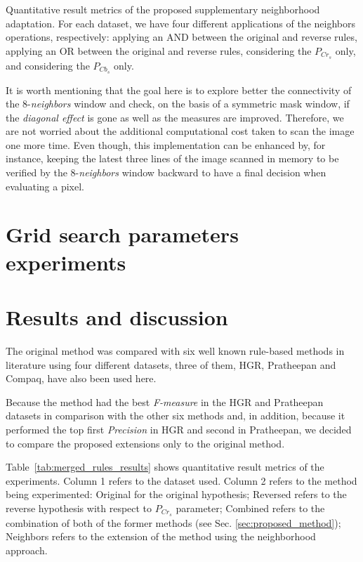 \begin{table}[ht]
\caption[Quantitative result metrics of the proposed supplementary neighborhood adaptation]{Quantitative result metrics of the proposed supplementary neighborhood adaptation. For each dataset, we have four different applications of the neighbors operations, respectively: applying an AND between the original and reverse rules, applying an OR between the original and reverse rules, considering the $P_{Cr_{s}}$ only, and considering the $P_{Cb_{s}}$ only.}
\label{tab:sup_neighbors_results}

\end{table}

It is worth mentioning that the goal here is to explore better the connectivity of the 8-\textit{neighbors} window and check, on the basis of a symmetric mask window, if the \textit{diagonal effect} is gone as well as the measures are improved. Therefore, we are not worried about the additional computational cost taken to scan the image one more time. Even though, this implementation can be enhanced by, for instance, keeping the latest three lines of the image scanned in memory to be verified by the 8-\textit{neighbors} window backward to have a final decision when evaluating a pixel.


\section{Grid search parameters experiments}
\label{sec:grid_search_experiments}


\section{Results and discussion}

\noindent The original method was compared with six well known rule-based methods in literature using four different datasets, three of them, HGR, Pratheepan and Compaq, have also been used here.

Because the method had the best \textit{F-measure} in the HGR and Pratheepan datasets in comparison with the other six methods and, in addition, because it performed the top first \textit{Precision} in HGR and  second in Pratheepan, we decided to compare the proposed extensions only to the original method.

Table~\ref{tab:merged_rules_results} shows quantitative result metrics of the experiments. Column 1 refers to the dataset used. Column 2 refers to the method being experimented: Original for the original hypothesis;  Reversed refers to the reverse hypothesis with respect to $P_{Cr_{s}}$ parameter; Combined refers to the combination of both of the former methods (see  Sec. \ref{sec:proposed_method}); Neighbors refers to the extension of the method using the neighborhood approach.

